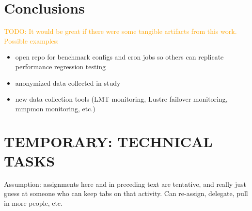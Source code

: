 \documentclass[conference,10pt,compsocconf]{IEEEtran}
\newcommand{\todo}[1]{\textcolor{Orange}{TODO: #1}}
\begin{document}
\section{Conclusions}

\todo{It would be great if there were some tangible artifacts from this work.
Possible examples:}
\begin{itemize}
\item open repo for benchmark configs and cron jobs so others can replicate
performance regression testing
\item anonymized data collected in study
\item new data collection tools (LMT monitoring, Lustre failover monitoring,
mmpmon monitoring, etc.)
\end{itemize}

\section{TEMPORARY: TECHNICAL TASKS}

Assumption: assignments here and in preceding text are tentative, and really
just guess at someone who can keep tabs on that activity.  Can re-assign,
delegate, pull in more people, etc.
\end{document}
